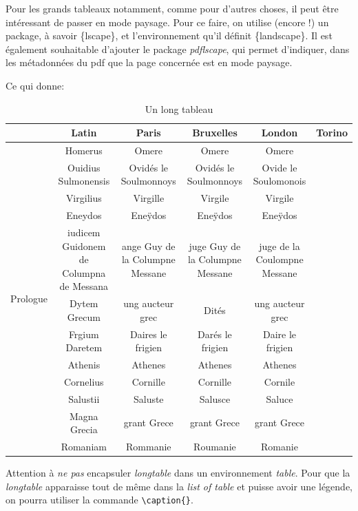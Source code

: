 \documentclass[a4paper,twoside,french,12pt]{article}
\begin{document}
Pour les grands tableaux notamment, comme pour d'autres choses, il peut être intéressant de passer en mode paysage. Pour ce faire, on utilise (encore !) un package, à savoir \{lscape\}, et l'environnement qu'il définit \{landscape\}. Il est également souhaitable d'ajouter le package \textit{pdflscape}, qui permet d'indiquer, dans les métadonnées du pdf que la page concernée est en mode paysage.


Ce qui donne:


\begin{landscape}

\begin{longtable}{|c|c|c|c|c|c|}
\caption{Un long tableau}
\\ \hline
 & \textbf{Latin} & \textbf{Paris} & \textbf{Bruxelles} & \textbf{London} & \textbf{Torino} \\
\hline
\multirow{12}{*}{Prologue} &  Homerus  & Omere & Omere & Omere &  \\ \cline{2-6} & Ouidius Sulmonensis & Ovidés le Soulmonnoys & Ovidés le Soulmonnoys & Ovide le Soulomonois & \\ \cline{2-6} & Virgilius & Virgille & Virgile & Virgile &\\ \cline{2-6} & Eneydos & Eneÿdos & Eneÿdos &Eneÿdos & \\ \cline{2-6} & {\tiny iudicem Guidonem de Columpna de Messana} & {\tiny ange Guy de la Columpne Messane} & {\tiny juge Guy de la Columpne Messane} & {\tiny juge de la Coulompne Messane} &\\ \cline{2-6} & Dytem Grecum & ung aucteur grec & Dités & ung aucteur grec & \\  \cline{2-6} & Frgium Daretem & Daires le frigien & Darés le frigien & Daire le frigien & \\ \cline{2-6} & Athenis & Athenes & Athenes & Athenes &\\ \cline{2-6} & Cornelius & Cornille & Cornille & Cornile &\\ \cline{2-6} & Salustii & Saluste & Salusce & Saluce & \\ \cline{2-6} & Magna Grecia & grant Grece & grant Grece & grant Grece & \\ \cline{2-6} & Romaniam & Rommanie & Roumanie & Romanie & \\
\hline
\end{longtable}

Attention à \textit{ne pas} encapsuler \textit{longtable} dans un environnement \textit{table}. Pour que la \textit{longtable} apparaisse tout de même dans la \textit{list of table} et puisse avoir une légende, on pourra utiliser la commande \verb=\caption{}=.

%


\end{landscape}
\end{document}
